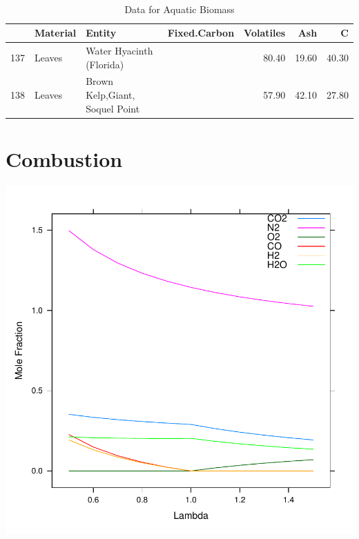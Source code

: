 \documentclass[a4paper]{article}
\begin{document}
\\
\newpage
\begin{table}[ht]
\begin{center}
\begin{tabular}{rllrrrr}
  \hline
 & Material & Entity & Fixed.Carbon & Volatiles & Ash & C \\ 
  \hline
137 & Leaves & Water Hyacinth (Florida) &  & 80.40 & 19.60 & 40.30 \\ 
  138 & Leaves & Brown Kelp,Giant, Soquel Point &  & 57.90 & 42.10 & 27.80 \\ 
   \hline
\end{tabular}
\caption{Data for Aquatic Biomass}
\end{center}
\end{table}
\section{Combustion}
\includegraphics{documentation/images/img-008}
\\
\end{document}
